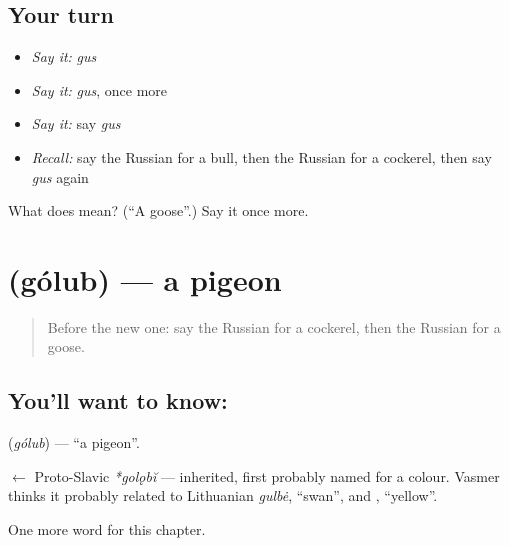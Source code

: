 \subsection*{Your turn}
\begin{itemize}
\raggedright
  \item \emph{Say it:} \emph{gus}
  \item \emph{Say it:} \emph{gus}, once more
  \item \emph{Say it:} say \emph{gus}
  \item \emph{Recall:} say the Russian for a bull, then the Russian for a cockerel, then say \emph{gus} again
\end{itemize}

\begin{tcolorbox}[breakable,colback=teal!4,colframe=teal!35!black,title={Before you move on}]
What does  mean? (\textquotedblleft{}A goose\textquotedblright{}.) Say it once more.
\end{tcolorbox}
\section[\texorpdfstring{\ru{голубь} (gólub)}{голубь (gólub)}]{ (gólub) — a pigeon}

\label{lesson:RU-C251-golub}



\begin{quote}
Before the new one: say the Russian for a cockerel, then the Russian for a goose.
\end{quote}

\subsection*{You'll want to know: }
\textbf{} (\emph{gólub}) — \textquotedblleft{}a pigeon\textquotedblright{}.

\begin{cousinweb}
\textbf{} $\leftarrow$ Proto-Slavic \emph{*golǫbĭ} — inherited, first probably named for a colour. Vasmer thinks it probably related to Lithuanian \emph{gulbė}, \textquotedblleft{}swan\textquotedblright{}, and \emph{}, \textquotedblleft{}yellow\textquotedblright{}.
\end{cousinweb}

\begin{grammarlens}[title={What you've built}]
One more word for this chapter.
\end{grammarlens}

